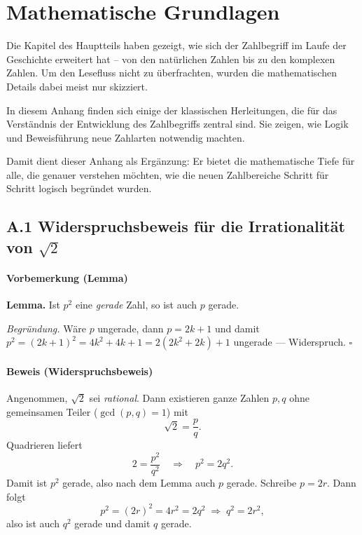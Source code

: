 

\appendix
\renewcommand{\thesection}{A.\arabic{section}}

\renewcommand{\thechapter}{A}
\chapter{Mathematische Grundlagen}
\label{anhangA_mathe}



\noindent
Die Kapitel des Hauptteils haben gezeigt, wie sich der Zahlbegriff im Laufe der Geschichte 
erweitert hat – von den natürlichen Zahlen bis zu den komplexen Zahlen. 
Um den Lesefluss nicht zu überfrachten, wurden die mathematischen Details dabei 
meist nur skizziert. 

In diesem Anhang finden sich einige der klassischen Herleitungen, die für das Verständnis 
der Entwicklung des Zahlbegriffs zentral sind. Sie zeigen, wie Logik und Beweisführung 
neue Zahlarten notwendig machten. 


Damit dient dieser Anhang als Ergänzung: Er bietet die mathematische Tiefe für alle, 
die genauer verstehen möchten, wie die neuen Zahlbereiche Schritt für Schritt 
logisch begründet wurden.

\newpage
{}\label{anhangA_wurzel2}
\section*{A.1 Widerspruchsbeweis für die Irrationalität von $\sqrt{2}$}
\label{anhangA_wurzel2}

\noindent



\subsubsection*{Vorbemerkung (Lemma)}
\textbf{Lemma.} Ist $p^2$ eine \emph{gerade} Zahl, so ist auch $p$ gerade.

\emph{Begründung.} Wäre $p$ ungerade, dann $p=2k+1$ und damit
$p^2=(2k+1)^2=4k^2+4k+1=2(2k^2+2k)+1$ ungerade — Widerspruch. \hfill$\square$

\vspace{0.5em}

\subsubsection*{Beweis (Widerspruchsbeweis)}
Angenommen, $\sqrt{2}$ sei \emph{rational}. Dann existieren ganze Zahlen $p,q$ ohne gemeinsamen Teiler
($\gcd(p,q)=1$) mit
\[
\sqrt{2}=\frac{p}{q}.
\]
Quadrieren liefert
\[
2=\frac{p^2}{q^2}\quad\Longrightarrow\quad p^2=2q^2.
\]
Damit ist $p^2$ gerade, also nach dem Lemma auch $p$ gerade. Schreibe $p=2r$.
Dann folgt
\[
p^2=(2r)^2=4r^2=2q^2 \;\Longrightarrow\; q^2=2r^2,
\]
also ist auch $q^2$ gerade und damit $q$ gerade.

